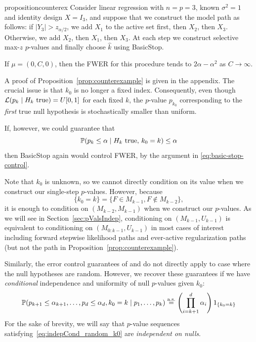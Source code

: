 \documentclass{article}
\begin{document}
\begin{restatable}{proposition}{counterex}\label{prop:counterexample}
  Consider linear regression with $n=p=3$, known $\sigma^2=1$ and identity design $X=I_3$, and suppose that we construct the model path as follows: if $|Y_3|>z_{\alpha/2}$, we add $X_1$ to the active set first, then $X_2$, then $X_3$. Otherwise, we add $X_2$, then $X_1$, then $X_3$. At each step we construct selective max-$z$ $p$-values and finally choose $\hat k$ using BasicStop. 

  If $\mu=(0,C,0)$, then the FWER for this procedure tends to $2\alpha-\alpha^2$ as $C\to\infty$.
\end{restatable}

A proof of Proposition~\ref{prop:counterexample} is given in the appendix. The crucial issue is that $k_0$ is no longer a fixed index. Consequently, even though $\L(p_k \mid H_k \text{ true})=U[0,1]$ for each fixed $k$, the $p$-value $p_{k_0}$ corresponding to the {\em first} true null hypothesis is stochastically smaller than uniform.

If, however, we could guarantee that
\[
\P(p_k \leq \alpha \mid H_k \text{ true},\, k_0=k) \leq \alpha
\]
then BasicStop again would control FWER, by the argument in \ref{eq:basic-stop-control}. 

Note that $k_0$ is unknown, so we cannot directly condition on its value when we construct our single-step $p$-values. However, because
\[
\{k_0=k\} = \{F\in M_{k-1}, F\notin M_{k-2}\},
\]
it is enough to condition on $(M_{k-2}, M_{k-1})$ when we construct our $p$-values. As we will see in Section~\ref{sec:pValsIndep}, conditioning on $(M_{k-1}, U_{k-1})$ is equivalent to conditioning on $(M_{0:k-1}, U_{k-1})$ in most cases of interest including forward stepwise likelihood paths and ever-active regularization paths (but not the path in Proposition~\ref{prop:counterexample}).

Similarly, the error control guarantees of \citet{gsell2013sequential} and \citet{li2015accumulation} do not directly apply to case where the null hypotheses are random. However, we recover these guarantees if we have {\em conditional} independence and uniformity of null $p$-values given $k_0$:
\begin{equation}\label{eq:indepCond_random_k0}
  \P(p_{k+1} \leq \alpha_{k+1}, \ldots, p_d \leq \alpha_d, k_0 = k
  \mid p_1, \ldots, p_k ) \eqAS \left(\prod_{i=k+1}^d \alpha_i\right) 1_{\{k_0=k\}}
\end{equation}
For the sake of brevity, we will say that $p$-value sequences satisfying~\eqref{eq:indepCond_random_k0} are {\em independent on nulls}.
\end{document}
